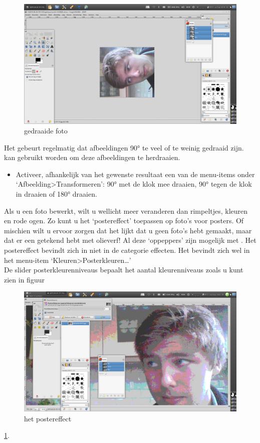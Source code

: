 \documentclass[11pt,a5paper,twoside]{book}
\begin{document}
   \begin{figure}
    \centering
    \includegraphics[width=1\linewidth]{draaien/1.png}
    \caption{gedraaide foto}
   \end{figure}
   Het gebeurt regelmatig dat afbeeldingen 90° te veel of te weinig
    gedraaid zijn. \GIMP{} kan gebruikt worden om deze afbeeldingen
    te herdraaien.
   \begin{itemize}
    \item[1.] Activeer, afhankelijk van het gewenste resultaat een van
     de menu-items onder ‘Afbeelding>Transformeren’: 90° met de klok
     mee draaien, 90° tegen de klok in draaien of 180° draaien.
   \end{itemize}
 \label{ding:oppepper}
  Als u een foto bewerkt, wilt u wellicht meer veranderen dan rimpeltjes,
   kleuren en rode ogen. Zo kunt u het ‘postereffect’ toepassen op foto’s
   voor posters. Of mischien wilt u ervoor zorgen dat het lijkt dat u geen
   foto’s hebt gemaakt, maar dat er een getekend hebt met olieverf!
  Al deze ‘oppeppers’ zijn mogelijk met \GIMP{}.
  \label{ding:posterkleuren}\label{ding:postereffect}
   Het postereffect bevindt zich in \GIMP{} niet in de categorie effecten.
   Het bevindt zich wel in het menu-item ‘Kleuren>Posterkleuren…’\\
   De slider posterkleurenniveaus bepaalt het aantal kleurenniveaus zoals
    u kunt zien in figuur \begin{figure}
     \includegraphics[width=0.90\linewidth]{oppepper/poster.png}
     \caption{het postereffect}
     \label{gx:poster}
    \end{figure}\ref{gx:poster}.
\end{document}
